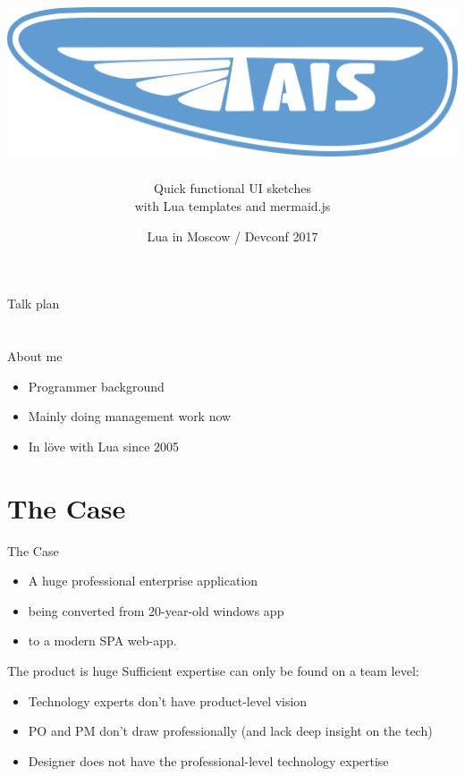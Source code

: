 \documentclass[aspectratio=43,handout,bigger]{beamer}
\title{\includegraphics[height=.15\textheight]{logo}}
\author{Quick functional UI sketches\\with Lua templates and mermaid.js}
\institute{Alexander Gladysh\\@agladysh}
\date{Lua in Moscow / Devconf 2017}
\begin{document}
\begin{frame}[plain]
 \titlepage
\end{frame}


\begin{frame}{Talk plan}

\tableofcontents

\end{frame}


\section*{}

\begin{frame}{About me}

\begin{itemize}
\item Programmer background
\item Mainly doing management work now
\item In löve with Lua since 2005
\end{itemize}

\end{frame}

\section{The Case}

\begin{frame}{The Case}
  \begin{itemize}
    \item A huge professional enterprise application
    \item being converted from 20-year-old windows app
    \item to a modern SPA web-app.
  \end{itemize}
\end{frame}


\begin{frame}{The product is huge}
  Sufficient expertise can only be found on a team level:

  \begin{itemize}
    \item Technology experts don't have product-level vision
    \item PO and PM don't draw professionally
          (and lack deep insight on the tech)
    \item Designer does not have the professional-level technology expertise
  \end{itemize}
\end{frame}
\end{document}
